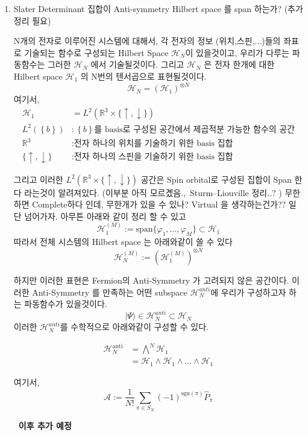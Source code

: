 \documentclass[11pt]{article}
\begin{document}
\begin{enumerate}[label=\(\mathrm{i}\))]
\item {Slater Determinant 집합이 Anti-symmetry Hilbert space 를 span 하는가? (추가 정리 필요)}

N개의 전자로 이루어진 시스템에 대해서, 각 전자의 정보 (위치,스핀,...)들의 좌표로 기술되는 함수로 구성되는 Hilbert Space \(\mathcal{H}_N\)이 있을것이고, 우리가 다루는 파동함수는 그러한 \(\mathcal{H}_N\) 에서 기술될것이다. 
그리고 \(\mathcal{H}_N\) 은 전자 한개에 대한 Hilbert space \(\mathcal{H}_1\) 의 N번의 텐서곱으로 표현될것이다. 
\[
\mathcal{H}_N = (\mathcal{H}_1)^{\otimes N}
\]
여기서,
\begin{align*}
\mathcal{H}_1 &=  L^2(\mathbb{R}^3 \times \{\uparrow, \downarrow\}) \\
L^2 (\left\{b\right\}) &: \left\{b\right\} \text{를 basis로 구성된 공간에서 제곱적분 가능한 함수의 공간} \\
\mathbb{R}^3 &: \text{전자 하나의 위치를 기술하기 위한 basis 집합}\\
\{\uparrow, \downarrow\} &: \text{전자 하나의 스핀을 기술하기 위한 basis 집합}
\end{align*}

그리고 이러한 \(L^2(\mathbb{R}^3 \times \{\uparrow, \downarrow\})\) 공간은 Spin orbital로 구성된 집합이 Span 한다 라는것이 알려져있다. 
(이부분 아직 모르곘음.,~Sturm–Liouville 정리..? )
무한하면 Complete하다 인데, 무한개가 있을 수 있나? Virtual 을 생각하는건가?? 
일단 넘어가자. 
아무튼 아래와 같이 정리 할 수 있고 
\[
\mathcal{H}_1^{(M)} := \text{span} \{ \varphi_1, \dots, \varphi_M \} \subset \mathcal{H}_1
\]
따라서 전체 시스템의 Hilbert space 는 아래와같이 쓸 수 있다 
\[
\mathcal{H}_N^{(M)} := \left( \mathcal{H}_1^{(M)} \right)^{\otimes N}
\]

하지만 이러한 표현은 Fermion의 Anti-Symmetry 가 고려되지 않은 공간이다. 이러한 Anti-Symmetry 를 만족하는 어떤 subspace \(\mathcal{H}_N^{anti}\)에 우리가 구성하고자 하는 파동함수가 있을것이다. 
\[
\vert \Psi \rangle \in \mathcal{H}_N^{anti} \subset \mathcal{H}_N
\]
이러한 \(\mathcal{H}_N^{anti}\)를 수학적으로 아래와같이 구성할 수 있다. 


\begin{align*}
\mathcal{H}_N^{\text{anti}} &= \bigwedge^N \mathcal{H}_1\\
&= \mathcal{H}_1 \wedge \mathcal{H}_1 \wedge \dots \wedge \mathcal{H}_1
\end{align*}

여기서, 
\[
\mathcal{A} := \frac{1}{N!} \sum_{\pi \in S_N} (-1)^{\text{sgn}(\pi)} \hat{P}_\pi
\]

\begin{center}
\textbf{\Large ~이후 추가 예정~}
\end{center}
\end{enumerate}
\end{document}
